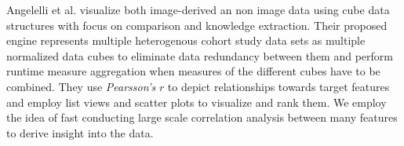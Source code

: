 \documentclass[journal]{style/vgtc} 			          %
\begin{document}
Angelelli et al. \cite{Angelelli} visualize both image-derived an non image data using cube data structures with focus on comparison and knowledge extraction.
Their proposed engine represents multiple heterogenous cohort study data sets as multiple normalized data cubes to eliminate data redundancy between them and perform runtime measure aggregation when measures of the different cubes have to be combined.
They use \emph{Pearsson's} $r$ to depict relationships towards target features and employ list views and scatter plots to visualize and rank them.
We employ the idea of fast conducting large scale correlation analysis between many features to derive insight into the data.
\end{document}
